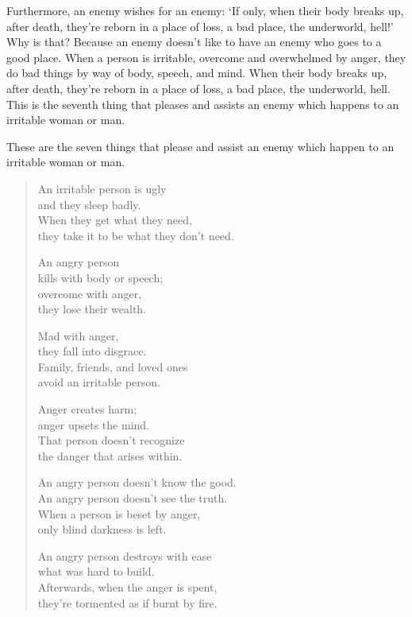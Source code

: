 \documentclass[12pt,openany]{book}%
\begin{document}
Furthermore, an enemy wishes for an enemy: ‘If only, when their body breaks up, after death, they’re reborn in a place of loss, a bad place, the underworld, hell!’ Why is that? Because an enemy doesn’t like to have an enemy who goes to a good place. When a person is irritable, overcome and overwhelmed by anger, they do bad things by way of body, speech, and mind. When their body breaks up, after death, they’re reborn in a place of loss, a bad place, the underworld, hell. This is the seventh thing that pleases and assists an enemy which happens to an irritable woman or man. 

These are the seven things that please and assist an enemy which happen to an irritable woman or man. 

\begin{verse}%
An irritable person is ugly \\
and they sleep badly. \\
When they get what they need, \\
they take it to be what they don’t need. 

An angry person \\
kills with body or speech; \\
overcome with anger, \\
they lose their wealth. 

Mad with anger, \\
they fall into disgrace. \\
Family, friends, and loved ones \\
avoid an irritable person. 

Anger creates harm; \\
anger upsets the mind. \\
That person doesn’t recognize \\
the danger that arises within. 

An angry person doesn’t know the good. \\
An angry person doesn’t see the truth. \\
When a person is beset by anger, \\
only blind darkness is left. 

An angry person destroys with ease \\
what was hard to build. \\
Afterwards, when the anger is spent, \\
they’re tormented as if burnt by fire. 


\end{verse}
\end{document}
